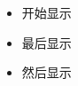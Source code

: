 \documentclass[nofonts]{beamer}
\begin{document}
\begin{frame}
	\begin{itemize}
		\item<1-> 开始显示
		\item<3-> 最后显示
		\item<2-> 然后显示
	\end{itemize}
\end{frame}
\end{document}
